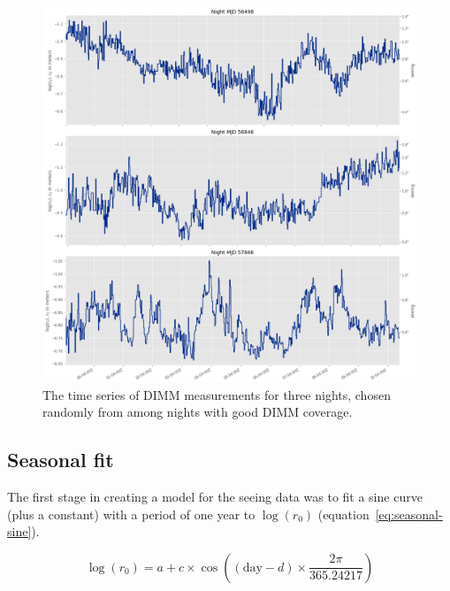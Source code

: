 \documentclass[DM,authoryear,toc]{lsstdoc}
\begin{document}
\begin{figure}
  \includegraphics[width=\columnwidth]{./figures/random_nights_dimm.png}
  \caption{The time series of DIMM
measurements for three nights, chosen randomly from among nights with
good DIMM coverage. }
  \label{fig:random-nights-dimm}
\end{figure}

\subsection{Seasonal fit}
\label{sec:seasonal}

The first stage in creating a model for the seeing data was to fit a
sine curve (plus a constant) with a period of one year to
$\log(r_0)$ (equation~\ref{eq:seasonal-sine}).

\begin{equation} \label{eq:seasonal-sine}
\log(r_0) = a + c \times \cos\left( (\mbox{day} - d) \times \frac{2\pi}{365.24217} \right)
\end{equation}
\end{document}
